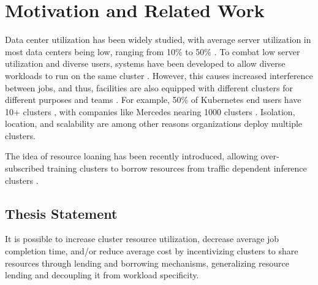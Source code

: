 \section{Motivation and Related Work}
Data center utilization has been widely studied, with average server utilization in most data centers being low, 
ranging from 10\% to 50\%
\cite{lo_heracles_2015}. 
To combat low server utilization and diverse users, systems have been developed to allow diverse workloads to run 
on the same cluster \cite{bhattacharya_hierarchical_2013, hindman_mesos_nodate}. 
However, this causes increased interference between jobs, and thus, 
facilities are also equipped with different clusters for different purposes and teams \cite{patel_what_2022, li_lyra_2023}. 
For example, 50\% of Kubernetes \cite{verma_large-scale_2015}
end users have 10+ clusters \cite{noauthor_cncf_2023} 
, with companies like Mercedes nearing 1000 clusters \cite{noauthor_mercedes-benz_2023}.
Isolation, location, and scalability are among other reasons organizations deploy multiple clusters.

The idea of resource loaning has been recently introduced, allowing over-subscribed training clusters to 
borrow resources from traffic dependent inference clusters \cite{li_lyra_2023}.

\subsection{Thesis Statement}
It is possible to increase cluster resource utilization, decrease average job completion time, 
and/or reduce average cost by incentivizing clusters to share resources through lending and borrowing mechanisms, 
generalizing resource lending and decoupling it from workload specificity.

